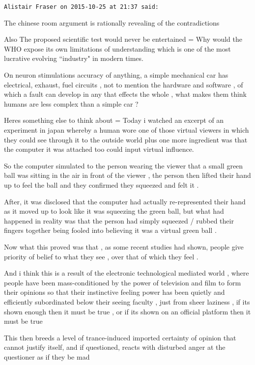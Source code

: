 \begin{footnotesize}
\begin{sffamily}
\hfill

\texttt{Alistair Fraser on 2015-10-25 at 21:37 said: }

The chinese room argument is rationally revealing of the contradictions

Also The proposed scientific test would never be entertained = Why would the WHO expose its own limitations of understanding which is one of the most lucrative evolving ``industry" in modern times.

On neuron stimulations accuracy of anything, a simple mechanical car has electrical, exhaust, fuel circuits , not to mention the hardware and software , of which a fault can develop in any that effects the whole , what makes them think humans are less complex than a simple car ?

Heres something else to think about = Today i watched an excerpt of an experiment in japan whereby a human wore one of those virtual viewers in which they could see through it to the outside world plus one more ingredient was that the computer it was attached too could input virtual influence.

So the computer simulated to the person wearing the viewer that a small green ball was sitting in the air in front of the viewer , the person then lifted their hand up to feel the ball and they confirmed they squeezed and felt it .

After, it was disclosed that the computer had actually re-represented their hand as it moved up to look like it was squeezing the green ball, but what had happened in reality was that the person had simply squeezed / rubbed their fingers together being fooled into believing it was a virtual green ball .

Now what this proved was that , as some recent studies had shown, people give priority of belief to what they see , over that of which they feel .

And i think this is a result of the electronic technological mediated world , where people have been mass-conditioned by the power of television and film to form their opinions so that their instinctive feeling power has been quietly and efficiently subordinated below their seeing faculty , just from sheer laziness , if its shown enough then it must be true , or if its shown on an official platform then it must be true

This then breeds a level of trance-induced imported certainty of opinion that cannot justify itself, and if questioned, reacts with disturbed anger at the questioner as if they be mad



\end{sffamily}
\end{footnotesize}
